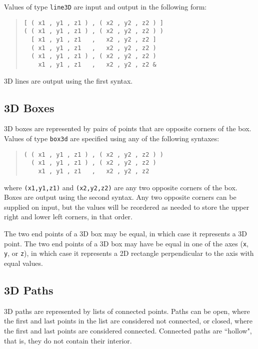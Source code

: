 \documentclass[10pt]{article}
\begin{document}
Values of type \verb+line3D+ are input and output in the following form:
\begin{quote}
\begin{verbatim}
[ ( x1 , y1 , z1 ) , ( x2 , y2 , z2 ) ]
( ( x1 , y1 , z1 ) , ( x2 , y2 , z2 ) ) 
  [ x1 , y1 , z1   ,   x2 , y2 , z2 ] 
  ( x1 , y1 , z1   ,   x2 , y2 , z2 ) 
  ( x1 , y1 , z1 ) , ( x2 , y2 , z2 )
    x1 , y1 , z1   ,   x2 , y2 , z2 & 
\end{verbatim}
\end{quote}
3D lines are output using the first syntax.

\subsection{3D Boxes}

3D boxes are represented by pairs of points that are opposite corners of the box. 
Values of type \verb+box3d+ are specified using any of the following syntaxes:
\begin{quote}
\begin{verbatim}
( ( x1 , y1 , z1 ) , ( x2 , y2 , z2 ) )
  ( x1 , y1 , z1 ) , ( x2 , y2 , z2 )
    x1 , y1 , z1   ,   x2 , y2 , z2
\end{verbatim}
\end{quote}
where \verb+(x1,y1,z1)+ and \verb+(x2,y2,z2)+ are any two opposite corners of the box.
Boxes are output using the second syntax.
Any two opposite corners can be supplied on input, but the values will be reordered 
as needed to store the upper right and lower left corners, in that order.

The two end points of a 3D box may be equal, in which case it represents a 3D point.
The two end points of a 3D box may have be equal in one of the axes (\verb+x+, \verb+y+,
or \verb+z+), in which case it represents a 2D rectangle perpendicular to the axis
with equal values.

\subsection{3D Paths}

3D paths are represented by lists of connected points. Paths can be open, where the first and last points in the list are considered not connected, or closed, where the first and last points are considered connected. Connected
paths are ``hollow", that is, they do not contain their interior.
\end{document}
